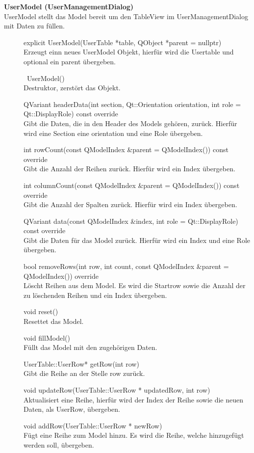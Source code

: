 \textbf{UserModel (UserManagementDialog)}\\
UserModel stellt das Model bereit um den TableView im UserManagementDialog mit Daten zu füllen.
\begin{description}
	\item[ ] explicit UserModel(UserTable *table, QObject *parent = nullptr) \\
	Erzeugt einn neues UserModel Objekt, hierfür wird die Usertable und optional ein parent übergeben.
  	\item[ ] ~UserModel() \\
  	Destruktor, zerstört das Objekt.
	\item[ ] QVariant headerData(int section, Qt::Orientation orientation, int role = Qt::DisplayRole) const override \\
  	Gibt die Daten, die in den Header des Models gehören, zurück. Hierfür wird eine Section eine orientation und eine Role übergeben.
	\item[ ] int rowCount(const QModelIndex \&parent = QModelIndex()) const override \\
  	Gibt die Anzahl der Reihen zurück. Hierfür wird ein Index übergeben.
	\item[ ] int columnCount(const QModelIndex \&parent = QModelIndex()) const override \\
  	Gibt die Anzahl der Spalten zurück. Hierfür wird ein Index übergeben.
	\item[ ] QVariant data(const QModelIndex \&index, int role = Qt::DisplayRole) const override \\
  	Gibt die Daten für das Model zurück. Hierfür wird ein Index und eine Role übergeben.
	\item[ ] bool removeRows(int row, int count, const QModelIndex \&parent = QModelIndex()) override \\
	Löscht Reihen aus dem Model. Es wird die Startrow sowie die Anzahl der zu löschenden Reihen und ein Index übergeben.
	\item[ ] void reset() \\
  	Resettet das Model.
	\item[ ] void fillModel() \\
	Füllt das Model mit den zugehörigen Daten.
	\item[ ] UserTable::UserRow* getRow(int row) \\
  	Gibt die Reihe an der Stelle row zurück.
	\item[ ] void updateRow(UserTable::UserRow * updatedRow, int row) \\
  	Aktualisiert eine Reihe, hierfür wird der Index der Reihe sowie die neuen Daten, als UserRow, übergeben.
	\item[ ] void addRow(UserTable::UserRow * newRow) \\
	Fügt eine Reihe zum Model hinzu. Es wird die Reihe, welche hinzugefügt werden soll, übergeben.
\end{description}

